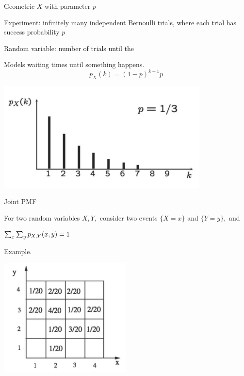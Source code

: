 \documentclass[handout,fleqn,aspectratio=169]{beamer}
\begin{document}
\begin{frame}{Geometric $X$ with parameter $p$}

{
\plitemsep 0.1in
\bci 
\item<1-> Experiment: infinitely many independent Bernoulli trials, where each trial has success probability $p$

\item<2-> Random variable: number of trials until the  

\item<3-> Models waiting times until something happens. 
$$
p_X(k) =  (1-p)^{k-1} p
$$
\eci 
}
{
\centering
\includegraphics[width=0.8\textwidth]{L6_geo_ex.png}
}
\end{frame}

\begin{frame}{Joint PMF}

{
\plitemsep 0.1in
\bci 

\item<2->  For two random variables $X,Y,$ consider two events
$\{X = x \}$ and $\{Y = y \},$ and
\item<4-> $\sum_x \sum_y p_{X,Y}(x,y) = 1$

\item<5->  

\eci 
}
{
Example.

\medskip
\centering
\includegraphics[width=0.5\textwidth]{L6_joint_ex.png}
}
\end{frame}
\end{document}
